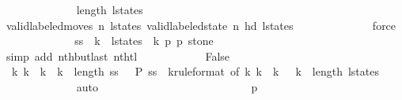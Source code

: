 \begin{isabellebody}
\ \ \ \ \ \ \ \ \ \ \ \ \isamarkupfalse%
\ {\isacharbackquoteopen}length\ l{\isacharunderscore}states\ {\isasymge}\ {}{\isacharbackquoteclose}\isanewline
\ \ \ \ \ \ \ \ \ \ \ \ \isamarkupfalse%
\ {\isacharbackquoteopen}valid{\isacharunderscore}labeled{\isacharunderscore}moves\ n\ l{\isacharunderscore}states{\isacharbackquoteclose}\ {\isacharbackquoteopen}valid{\isacharunderscore}labeled{\isacharunderscore}state\ n\ {\isacharparenleft}hd\ l{\isacharunderscore}states{\isacharparenright}{\isacharbackquoteclose}\isanewline
\ \ \ \ \ \ \ \ \ \ \ \ \isamarkupfalse%
\ force\isanewline
\ \ \ \ \ \ \ \ \ \ \isamarkupfalse%
\ \isamarkupfalse%
\ {\isachardoublequoteopen}{\isacharquery}ss\ {\isacharbang}\ k{\isacharprime}\ {\isacharequal}\ {\isacharparenleft}l{\isacharunderscore}states\ {\isacharbang}\ k{\isacharprime}{\isacharcomma}\ p{}{\isacharprime}{\isacharprime}{\isacharcomma}\ p{}{\isacharprime}{\isacharprime}{\isacharcomma}\ stone{\isacharparenright}{\isachardoublequoteclose}\isanewline
\ \ \ \ \ \ \ \ \ \ \ \ \isamarkupfalse%
\ {\isacharparenleft}simp\ add{\isacharcolon}\ nth{\isacharunderscore}butlast\ nth{\isacharunderscore}tl{\isacharparenright}\isanewline
\ \ \ \ \ \ \ \ \ \ \isamarkupfalse%
\ False\isanewline
\ \ \ \ \ \ \ \ \ \ \ \ \isamarkupfalse%
\ {\isacharbackquoteopen}{\isasymforall}\ k{\isacharprime}{\isachardot}\ k\ {\isacharless}\ k{\isacharprime}\ {\isasymand}\ k{\isacharprime}\ {\isacharless}\ length\ {\isacharquery}ss\ {\isasymlongrightarrow}\ {\isasymnot}\ {\isacharquery}P\ {\isacharparenleft}{\isacharquery}ss\ {\isacharbang}\ k{\isacharprime}{\isacharparenright}{\isacharbackquoteclose}{\isacharbrackleft}rule{\isacharunderscore}format{\isacharcomma}\ of\ k{\isacharprime}{\isacharbrackright}\ {\isacharbackquoteopen}k{\isacharprime}\ {\isasymge}\ k\ {\isacharplus}\ {}{\isacharbackquoteclose}\ {\isacharbackquoteopen}k{\isacharprime}\ {\isacharless}\ length\ l{\isacharunderscore}states\ {\isacharminus}\ {}{\isacharbackquoteclose}\isanewline
\ \ \ \ \ \ \ \ \ \ \ \ \isamarkupfalse%
\ auto\isanewline
\ \ \ \ \ \ \ \ \isamarkupfalse%
\isanewline
\ \ \ \ \ \ \ \ \isamarkupfalse%
\isanewline
\ \ \ \ \ \ \ \ \isamarkupfalse%
\ {\isachardoublequoteopen}{\isacharquery}p{}\ {}\ {\isacharequal}\ {}{\isachardoublequoteclose}\isanewline
\ \ \ \ \ \ \ \ \isamarkupfalse%

\end{isabellebody}

